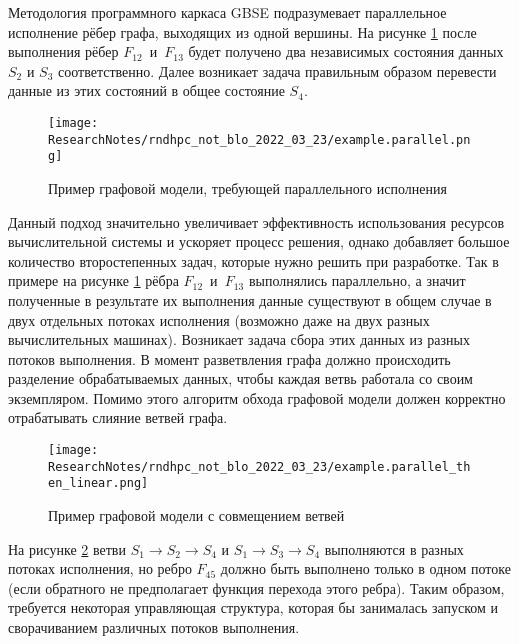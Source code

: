 \def\notedate{2021.09.19}
\def\currentauthor{Тришин~И.В.}
Методология программного каркаса GBSE подразумевает параллельное исполнение рёбер графа, выходящих из одной вершины. На рисунке \ref{fig:parallelExample} после выполнения рёбер $F_{12}$~и~$F_{13}$ будет получено два независимых состояния данных $S_2$ и $S_3$ соответственно. Далее возникает задача правильным образом перевести данные из этих состояний в общее состояние $S_4$.
\begin{figure}[!ht]
    \centering
    \texttt{[image: ResearchNotes/rndhpc\_not\_blo\_2022\_03\_23/example.parallel.png]}
    \caption{Пример графовой модели, требующей параллельного исполнения}
    \label{fig:parallelExample}
\end{figure}

Данный подход значительно увеличивает эффективность использования ресурсов вычислительной системы и ускоряет процесс решения, однако добавляет большое количество второстепенных задач, которые нужно решить при разработке. Так в примере на рисунке \ref{fig:parallelExample} рёбра $F_{12}$~и~$F_{13}$ выполнялись параллельно, а значит полученные в результате их выполнения данные существуют в общем случае в двух отдельных потоках исполнения (возможно даже на двух разных вычислительных машинах). Возникает задача сбора этих данных из разных потоков выполнения. В момент разветвления графа должно происходить разделение обрабатываемых данных, чтобы каждая ветвь работала со своим экземпляром. Помимо этого алгоритм обхода графовой модели должен корректно отрабатывать слияние ветвей графа.

\begin{figure}[!ht]
    \centering
    \texttt{[image: ResearchNotes/rndhpc\_not\_blo\_2022\_03\_23/example.parallel\_then\_linear.png]}
    \caption{Пример графовой модели с совмещением ветвей}
    \label{fig:parallelThenLinearExample}
\end{figure}

На рисунке \ref{fig:parallelThenLinearExample} ветви $S_1 \rightarrow S_2 \rightarrow S_4$ и $S_1 \rightarrow S_3 \rightarrow S_4$ выполняются в разных потоках исполнения, но ребро $F_{45}$ должно быть выполнено только в одном потоке (если обратного не предполагает функция перехода этого ребра). Таким образом, требуется некоторая управляющая структура, которая бы занималась запуском и сворачиванием различных потоков выполнения.

